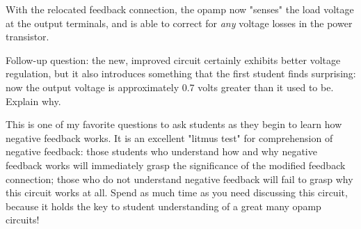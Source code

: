 
With the relocated feedback connection, the opamp now "senses" the load voltage at the output terminals, and is able to correct for {\it any} voltage losses in the power transistor.

\vskip 10pt

Follow-up question: the new, improved circuit certainly exhibits better voltage regulation, but it also introduces something that the first student finds surprising: now the output voltage is approximately 0.7 volts greater than it used to be.  Explain why.







This is one of my favorite questions to ask students as they begin to learn how negative feedback works.  It is an excellent "litmus test" for comprehension of negative feedback: those students who understand how and why negative feedback works will immediately grasp the significance of the modified feedback connection; those who do not understand negative feedback will fail to grasp why this circuit works at all.  Spend as much time as you need discussing this circuit, because it holds the key to student understanding of a great many opamp circuits!




